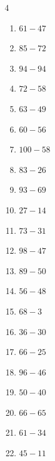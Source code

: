 \begin{multicols}{4}
\begin{enumerate}
  \item $61-47$
        \phantom{$=14$}

  \item $85-72$
        \phantom{$=13$}

  \item $94-94$
        \phantom{$=0$}

  \item $72-58$
        \phantom{$=14$}

  \item $63-49$
        \phantom{$=14$}

\columnbreak %

  \item $60-56$
        \phantom{$=4$}

  \item $100-58$
        \phantom{$=42$}

  \item $83-26$
        \phantom{$=57$}

  \item $93-69$
        \phantom{$=24$}

  \item $27-14$
        \phantom{$=13$}

  \item $73-31$
        \phantom{$=42$}

  \item $98-47$
        \phantom{$=51$}

  \item $89-50$
        \phantom{$=39$}

  \item $56-48$
        \phantom{$=8$}

  \item $68-3$
        \phantom{$=65$}

  \item $36-30$
        \phantom{$=6$}

  \item $66-25$
        \phantom{$=41$}

  \item $96-46$
        \phantom{$=50$}

  \item $50-40$
        \phantom{$=10$}

  \item $66-65$
        \phantom{$=1$}

  \item $61-34$
        \phantom{$=27$}

  \item $45-11$
        \phantom{$=34$}


\end{enumerate}
\end{multicols}
